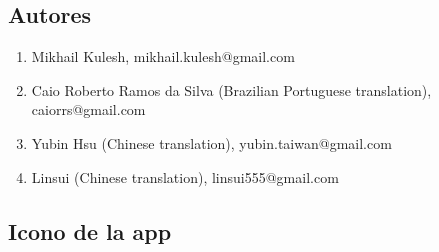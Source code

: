 \documentclass[DIV=calc, paper=a4, fontsize=11pt, twocolumn]{scrartcl}
\begin{document}
\subsection{Autores}

\begin{enumerate}
\item Mikhail Kulesh,
mikhail.kulesh@gmail.com

\item Caio Roberto Ramos da Silva
(Brazilian Portuguese translation),
caiorrs@gmail.com

\item Yubin Hsu
(Chinese translation),
yubin.taiwan@gmail.com

\item Linsui
(Chinese translation),
linsui555@gmail.com
\end{enumerate}

\subsection{Icono de la app}
\end{document}

